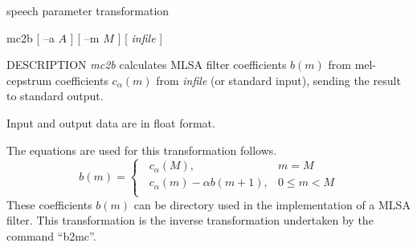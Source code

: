 % 
% 
% 
% 
%                                                                        
%
\hypertarget{mc2b}{}
%
{speech parameter transformation}

\begin{synopsis}
 \item [mc2b] [ --a $A$ ] [ --m $M$ ] [ {\em infile} ]
\end{synopsis}

\begin{qsection}{DESCRIPTION}
{\em mc2b} calculates MLSA filter coefficients $b(m)$ 
from mel-cepstrum coefficients $c_\alpha(m)$ 
from {\em infile} (or standard input), 
sending the result to standard output.

Input and output data are in float format.

The equations are used for this transformation follows.
\begin{displaymath}
b(m) = \begin{cases}
	  \;\; c_\alpha(M), & m=M \\
	  \;\; c_\alpha(m) - \alpha b(m+1), & 0 \leq m < M \\
	\end{cases}
\end{displaymath}
These coefficients $b(m)$ can be directory used in the
implementation of a MLSA filter.
This transformation is the inverse transformation undertaken
by the command ``b2mc''.
\end{qsection}

